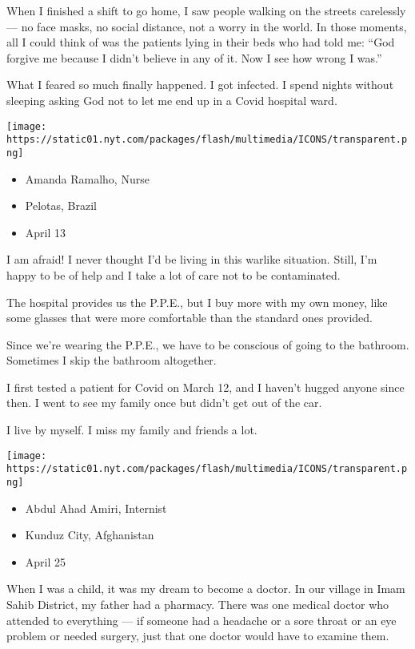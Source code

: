 When I finished a shift to go home, I saw people walking on the streets
carelessly --- no face masks, no social distance, not a worry in the
world. In those moments, all I could think of was the patients lying in
their beds who had told me: ``God forgive me because I didn't believe in
any of it. Now I see how wrong I was.''

What I feared so much finally happened. I got infected. I spend nights
without sleeping asking God not to let me end up in a Covid hospital
ward.

\texttt{[image: https://static01.nyt.com/packages/flash/multimedia/ICONS/transparent.png]}

\begin{itemize}
\tightlist
\item
  Amanda Ramalho, Nurse
\item
  Pelotas, Brazil
\item
  April 13
\end{itemize}

I am afraid! I never thought I'd be living in this warlike situation.
Still, I'm happy to be of help and I take a lot of care not to be
contaminated.

The hospital provides us the P.P.E., but I buy more with my own money,
like some glasses that were more comfortable than the standard ones
provided.

Since we're wearing the P.P.E., we have to be conscious of going to the
bathroom. Sometimes I skip the bathroom altogether.

I first tested a patient for Covid on March 12, and I haven't hugged
anyone since then. I went to see my family once but didn't get out of
the car.

I live by myself. I miss my family and friends a lot.

\texttt{[image: https://static01.nyt.com/packages/flash/multimedia/ICONS/transparent.png]}

\begin{itemize}
\tightlist
\item
  Abdul Ahad Amiri, Internist
\item
  Kunduz City, Afghanistan
\item
  April 25
\end{itemize}

When I was a child, it was my dream to become a doctor. In our village
in Imam Sahib District, my father had a pharmacy. There was one medical
doctor who attended to everything --- if someone had a headache or a
sore throat or an eye problem or needed surgery, just that one doctor
would have to examine them.

